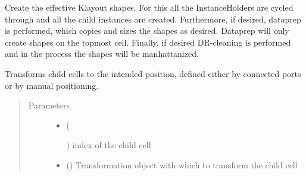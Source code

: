 \documentclass[a4paper,10pt,english]{sphinxmanual}
\begin{document}
\begin{fulllineitems}
\begin{fulllineitems}
\begin{quote}
\begin{description}
\begin{itemize}
\end{itemize}

\end{description}\end{quote}

\end{fulllineitems}


\begin{fulllineitems}
\label{\detokenize{photonics/photonics:kppc.photonics.PhotDevice.produce_impl}}
Create the effective Klayout shapes. For this all the InstanceHolders are cycled through and all the child
instances are created. Furthermore, if desired, dataprep is performed, which copies and sizes the shapes as
desired. Dataprep will only create shapes on the topmost cell. Finally, if desired DR-cleaning is performed and
in the process the shapes will be manhattanized.

\end{fulllineitems}


\begin{fulllineitems}
\label{\detokenize{photonics/photonics:kppc.photonics.PhotDevice.set_transformation}}
Transforms child cells to the intended position, defined either by connected ports or by manual
positioning.
\begin{quote}\begin{description}
\item[{Parameters}] \leavevmode\begin{itemize}
\item {} 
 (%
\begin{footnote}[72]\sphinxAtStartFootnote
{}
%
\end{footnote}) \textendash{} index of the child cell

\item {} 
 () \textendash{} Transformation object with which to transform the child cell


\end{itemize}
\end{description}
\end{quote}
\end{fulllineitems}
\end{fulllineitems}
\end{document}
